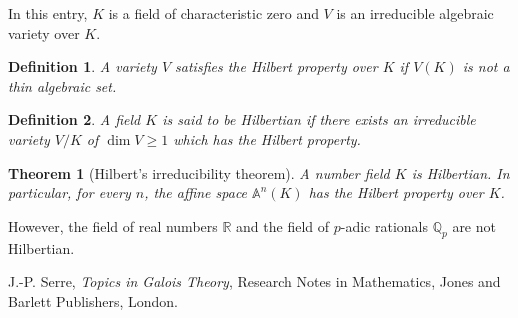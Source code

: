 \documentclass[12pt]{article}
\newtheorem*{thm}{Theorem}
\newtheorem{defn}{Definition}
\theoremstyle{definition}
\newcommand{\Reals}{\mathbb{R}}
\newcommand{\Rats}{\mathbb{Q}}
\begin{document}
In this entry, $K$ is a field of characteristic zero and $V$ is an irreducible algebraic variety over $K$.

\begin{defn}
A variety $V$ satisfies the Hilbert property over $K$ if $V(K)$ is not a thin algebraic set.
\end{defn}

\begin{defn}
A field $K$ is said to be Hilbertian if there exists an irreducible variety $V/K$ of $\dim V \geq 1$ which has the Hilbert property.
\end{defn}

\begin{thm}[Hilbert's irreducibility theorem]
A number field $K$ is Hilbertian. In particular, for every $n$, the affine space $\mathbb{A}^n(K)$ has the Hilbert property over $K$.
\end{thm}

However, the field of real numbers $\Reals$ and the field of $p$-adic rationals $\Rats_p$ are not Hilbertian.

\begin{thebibliography}{9}
 J.-P. Serre, {\em Topics in Galois Theory},
Research Notes in Mathematics, Jones and Barlett Publishers, London.
\end{thebibliography}
\end{document}
